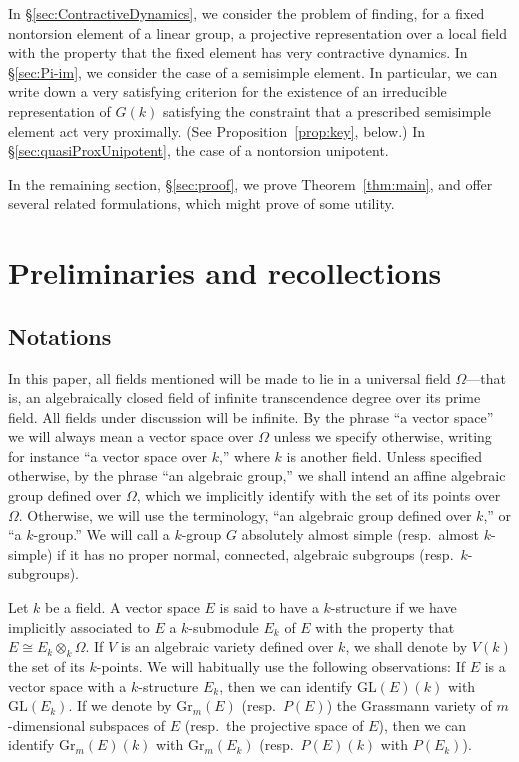 \documentclass{amsart}
\theoremstyle{plain}
\theoremstyle{definition}
\theoremstyle{remark}
\begin{document}
In \S\ref{sec:ContractiveDynamics}, we consider the problem of finding, for a fixed nontorsion element of a
linear group, a projective representation over a local field with the
property that the fixed element has very contractive dynamics. In \S\ref{sec:Pi-im}, we consider
the case of a semisimple element. In particular, we can write down a very satisfying criterion
for the existence of an irreducible representation of $G(k)$ satisfying the
constraint that a prescribed semisimple element act very proximally. (See Proposition~\ref{prop:key},
below.) In \S\ref{sec:quasiProxUnipotent}, the case of a
nontorsion unipotent.

In the remaining section, \S\ref{sec:proof}, we prove Theorem~\ref{thm:main}, and
offer several related formulations, which might prove of some utility.

\section{Preliminaries and recollections}
\subsection{Notations}
In this paper, all fields mentioned will be made to lie in a universal field $\Omega$---that
is, an algebraically closed field of infinite transcendence degree over its prime field.
All fields under discussion will be infinite.
By the phrase ``a vector space'' we will always mean a vector space over $\Omega$ unless
we specify otherwise, writing for instance ``a vector space over $k$,'' where $k$ is
another field. 
Unless specified otherwise, by the phrase ``an algebraic group,'' we shall intend an affine
algebraic
group defined over $\Omega$, which we implicitly identify with the set of its points over
$\Omega$. Otherwise, we will use the terminology, ``an algebraic group defined over
$k$,'' or ``a $k$-group.'' We will call a $k$-group $G$ absolutely almost simple (resp.\ 
almost $k$-simple)
if it has no proper normal, connected, algebraic subgroups (resp.\  $k$-subgroups).

Let $k$ be a field. A vector space $E$ is said to have a $k$-structure if we have
implicitly associated to $E$ a $k$-submodule $E_{k}$ of $E$ with the property that $E \cong
E_{k}\otimes_{k} \Omega$. If $V$ is an algebraic variety defined over $k$, we shall
denote by $V(k)$ the set of its $k$-points. We will habitually use the following
observations: If $E$ is a vector space with a $k$-structure $E_{k}$, then we can identify
 $\mathrm{GL}(E)(k)$ with $\mathrm{GL}(E_{k})$.  If we denote by $\mathrm{Gr}_{m}(E)$
(resp.\  $P(E)$) the Grassmann variety of $m$-dimensional subspaces of $E$ (resp.\  the
projective space of $E$),
then we can identify $\mathrm{Gr}_{m}(E)(k)$ with $\mathrm{Gr}_{m}(E_{k})$ (resp.\ 
$P(E)(k)$ with $P(E_{k})$).
\end{document}
